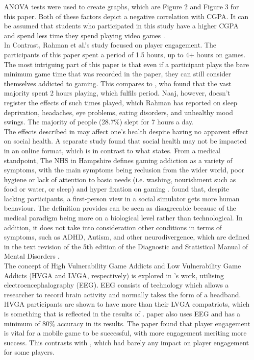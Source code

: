 \documentclass[conference]{IEEEtran}
\begin{document}
ANOVA tests were used to create graphs, which are Figure 2 and Figure 3 for this paper. Both of these factors depict a negative correlation with CGPA. It can be assumed that students who participated in this study have a higher CGPA and spend less time they spend playing video games \cite{Naaj2021}.\\

In Contrast, Rahman et al.’s \cite{Rahman2021} study focused on player engagement. The participants of this paper spent a period of 1.5 hours, up to 4+ hours on games. The most intriguing part of this paper is that even if a participant plays the bare minimum game time that was recorded in the paper, they can still consider themselves addicted to gaming. This compares to \cite{Naaj2021}, who found that the vast majority spent 2 hours playing, which fulfils \cite{Rahman2021} period. Naaj, however, doesn’t register the effects of such times played, which Rahman has reported on sleep deprivation, headaches, eye problems, eating disorders, and unhealthy mood swings. The majority of people (28.7\%) slept for 7 hours a day.\\

The effects described in \cite{Rahman2021} may affect one’s health despite having no apparent effect on social health. A separate study \cite{Schlagowski2024} found that social health may not be impacted in an online format, which is in contrast to what \cite{NHSHamp24} states. From a medical standpoint, The NHS in Hampshire defines gaming addiction as a variety of symptoms, with the main symptoms being reclusion from the wider world, poor hygiene or lack of attention to basic needs (i.e. washing, nourishment such as food or water, or sleep) and hyper fixation on gaming \cite{NHSHamp24}. \cite{Schlagowski2024} found that, despite lacking participants, a first-person view in a social simulator gets more human behaviour. The definition \cite{NHSHamp24} provides can be seen as disagreeable because of the medical paradigm being more on a biological level rather than technological. In addition, it does not take into consideration other conditions in terms of symptoms, such as ADHD, Autism, and other neurodivergence, which are defined in the text revision of the 5th edition of the Diagnostic and Statistical Manual of Mental Disorders \cite{Association2022}.\\

The concept of High Vulnerability Game Addicts and Low Vulnerability Game Addicts (HVGA and LVGA, respectively) is explored in \cite{Jing2024}’s work, utilising electroencephalography (EEG). EEG consists of technology which allows a researcher to record brain activity and normally takes the form of a headband. HVGA participants are shown to have more than their LVGA compatriots, which is something that is reflected in the results of \cite{Naaj2021}. \cite{Ruqeyya2022} paper also uses EEG and has a minimum of 80\% accuracy in its results. The paper found that player engagement is vital for a mobile game to be successful, with more engagement meriting more success. This contrasts with \cite{Schlagowski2024}, which had barely any impact on player engagement for some players.
\end{document}
